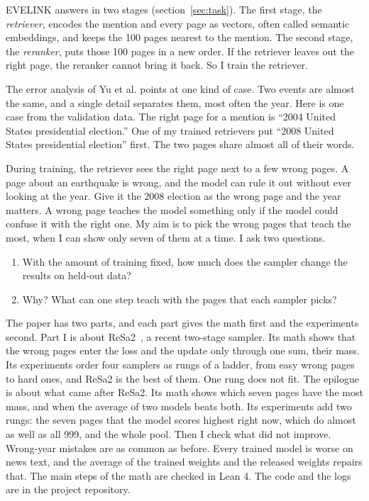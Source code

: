 \documentclass[11pt]{article}
\theoremstyle{definition}
\begin{document}
EVELINK answers in two stages (section~\ref{sec:task}). The first stage, the \emph{retriever}, encodes the mention and every page as vectors, often called semantic embeddings, and keeps the 100 pages nearest to the mention. The second stage, the \emph{reranker}, puts those 100 pages in a new order. If the retriever leaves out the right page, the reranker cannot bring it back. So I train the retriever.

The error analysis of Yu et al. points at one kind of case. Two events are almost the same, and a single detail separates them, most often the year. Here is one case from the validation data. The right page for a mention is ``2004 United States presidential election.'' One of my trained retrievers put ``2008 United States presidential election'' first. The two pages share almost all of their words.

During training, the retriever sees the right page next to a few wrong pages. A page about an earthquake is wrong, and the model can rule it out without ever looking at the year. Give it the 2008 election as the wrong page and the year matters. A wrong page teaches the model something only if the model could confuse it with the right one. My aim is to pick the wrong pages that teach the most, when I can show only seven of them at a time. I ask two questions.
\begin{enumerate}[nosep]
  \item With the amount of training fixed, how much does the sampler change the results on held-out data?
  \item Why? What can one step teach with the pages that each sampler picks?
\end{enumerate}

The paper has two parts, and each part gives the math first and the experiments second. Part I is about ReSa2~\cite{li2025resa2}, a recent two-stage sampler. Its math shows that the wrong pages enter the loss and the update only through one sum, their mass. Its experiments order four samplers as rungs of a ladder, from easy wrong pages to hard ones, and ReSa2 is the best of them. One rung does not fit. The epilogue is about what came after ReSa2. Its math shows which seven pages have the most mass, and when the average of two models beats both. Its experiments add two rungs: the seven pages that the model scores highest right now, which do almost as well as all 999, and the whole pool. Then I check what did not improve. Wrong-year mistakes are as common as before. Every trained model is worse on news text, and the average of the trained weights and the released weights repairs that. The main steps of the math are checked in Lean 4. The code and the logs are in the project repository.
\end{document}
